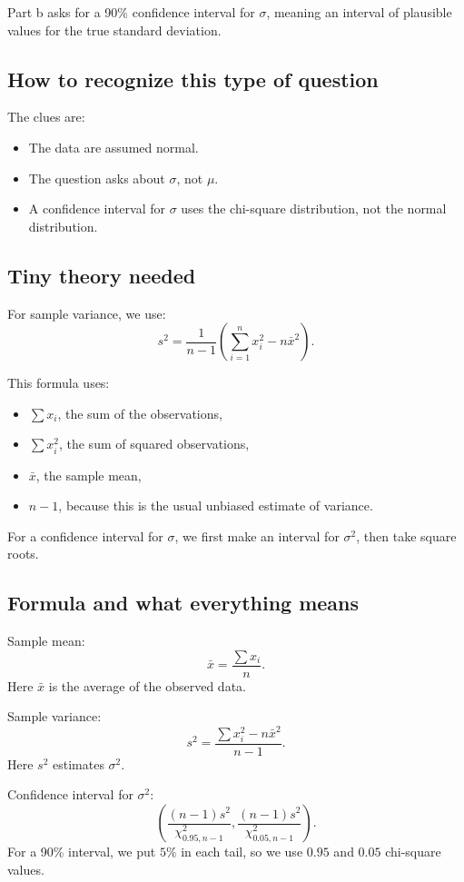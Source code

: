\documentclass[11pt,a4paper]{article}
\begin{document}
Part b asks for a 90\% confidence interval for \(\sigma\), meaning an interval of plausible values for the true standard deviation.

\subsection*{How to recognize this type of question}
The clues are:
\begin{itemize}[leftmargin=*]
    \item The data are assumed normal.
    \item The question asks about \(\sigma\), not \(\mu\).
    \item A confidence interval for \(\sigma\) uses the chi-square distribution, not the normal distribution.
\end{itemize}

\subsection*{Tiny theory needed}
For sample variance, we use:
\[
s^2=\frac{1}{n-1}\left(\sum_{i=1}^n x_i^2-n\bar{x}^2\right).
\]

This formula uses:
\begin{itemize}[leftmargin=*]
    \item \(\sum x_i\), the sum of the observations,
    \item \(\sum x_i^2\), the sum of squared observations,
    \item \(\bar{x}\), the sample mean,
    \item \(n-1\), because this is the usual unbiased estimate of variance.
\end{itemize}

For a confidence interval for \(\sigma\), we first make an interval for \(\sigma^2\), then take square roots.

\subsection*{Formula and what everything means}
Sample mean:
\[
\bar{x}=\frac{\sum x_i}{n}.
\]
Here \(\bar{x}\) is the average of the observed data.

Sample variance:
\[
s^2=\frac{\sum x_i^2-n\bar{x}^2}{n-1}.
\]
Here \(s^2\) estimates \(\sigma^2\).

Confidence interval for \(\sigma^2\):
\[
\left(
\frac{(n-1)s^2}{\chi^2_{0.95,n-1}},
\frac{(n-1)s^2}{\chi^2_{0.05,n-1}}
\right).
\]
For a 90\% interval, we put \(5\%\) in each tail, so we use \(0.95\) and \(0.05\) chi-square values.
\end{document}
